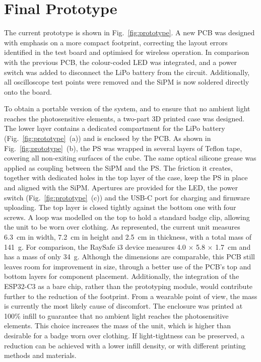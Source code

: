 \chapter{Final Prototype}

The current prototype is shown in Fig.~\ref{fig:prototype}.
A new PCB was designed with emphasis on a more compact footprint, correcting the layout errors identified in the test board and optimised for wireless operation. In comparison with the previous PCB, the colour-coded LED was integrated, and a power switch was added to disconnect the LiPo battery from the circuit. Additionally, all oscilloscope test points were removed and the SiPM is now soldered directly onto the board.

To obtain a portable version of the system, and to ensure that no ambient light reaches the photosensitive elements, a two-part 3D printed case was designed. The lower layer contains a dedicated compartment for the LiPo battery (Fig.~\ref{fig:prototype}~(a)) and is enclosed by the PCB. As shown in Fig.~\ref{fig:prototype}~(b), the PS was wrapped in several layers of Teflon tape, covering all non-exiting surfaces of the cube. The same optical silicone grease was applied as coupling between the SiPM and the PS. The friction it creates, together with dedicated holes in the top layer of the case, keep the PS in place and aligned with the SiPM. Apertures are provided for the LED, the power switch (Fig.~\ref{fig:prototype}~(c)) and the USB-C port for charging and firmware uploading. The top layer is closed tightly against the bottom one with four screws. A loop was modelled on the top to hold a standard badge clip, allowing the unit to be worn over clothing. As represented, the current unit measures 6.3~cm in width, 7.2~cm in height and 2.5~cm in thickness, with a total mass of 141~g. For comparison, the RaySafe i3 device measures 4.0 $\times$ 5.8 $\times$ 1.7~cm and has a mass of only 34~g. Although the dimensions are comparable, this PCB still leaves room for improvement in size, through a better use of the PCB's top and bottom layers for component placement. Additionally, the integration of the ESP32-C3 as a bare chip, rather than the prototyping module, would contribute further to the reduction of the footprint. From a wearable point of view, the mass is currently the most likely cause of discomfort. The enclosure was printed at 100\% infill to guarantee that no ambient light reaches the photosensitive elements. This choice increases the mass of the unit, which is higher than desirable for a badge worn over clothing. If light-tightness can be preserved, a reduction can be achieved with a lower infill density, or with different printing methods and materials.

